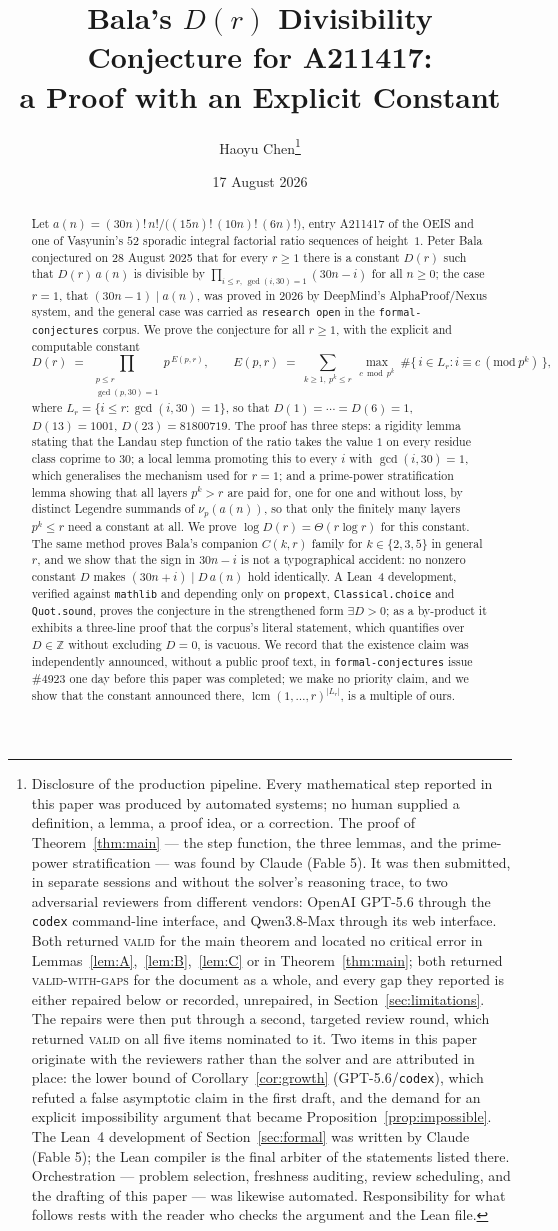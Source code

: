 \documentclass[11pt]{article}
\title{Bala's $D(r)$ Divisibility Conjecture for A211417:\\
a Proof with an Explicit Constant}
\author{Haoyu Chen\thanks{%
Disclosure of the production pipeline. Every mathematical step reported in this paper was
produced by automated systems; no human supplied a definition, a lemma, a proof idea, or a
correction. The proof of Theorem~\ref{thm:main} --- the step function, the three lemmas, and the
prime-power stratification --- was found by Claude (Fable 5). It was then submitted, in separate
sessions and without the solver's reasoning trace, to two adversarial reviewers from different
vendors: OpenAI GPT-5.6 through the \texttt{codex} command-line interface, and Qwen3.8-Max
through its web interface. Both returned \textsc{valid} for the main theorem and located no
critical error in Lemmas~\ref{lem:A},~\ref{lem:B},~\ref{lem:C} or in
Theorem~\ref{thm:main}; both returned \textsc{valid-with-gaps} for the document as a whole, and
every gap they reported is either repaired below or recorded, unrepaired, in
Section~\ref{sec:limitations}. The repairs were then put through a second, targeted review round,
which returned \textsc{valid} on all five items nominated to it. Two items in this paper originate with the reviewers rather than
the solver and are attributed in place: the lower bound of Corollary~\ref{cor:growth}
(GPT-5.6/\texttt{codex}), which refuted a false asymptotic claim in the first draft, and the
demand for an explicit impossibility argument that became
Proposition~\ref{prop:impossible}. The Lean~4 development of
Section~\ref{sec:formal} was written by Claude (Fable 5); the Lean compiler is the final arbiter
of the statements listed there. Orchestration --- problem selection, freshness auditing, review
scheduling, and the drafting of this paper --- was likewise automated. Responsibility for what
follows rests with the reader who checks the argument and the Lean file.}}
\date{17 August 2026}
\theoremstyle{plain}
\theoremstyle{definition}
\theoremstyle{remark}
\numberwithin{equation}{section}
\newcommand{\Z}{\mathbb{Z}}
\DeclareMathOperator{\lcm}{lcm}
\begin{document}
\maketitle

\begin{abstract}
Let $a(n) = (30n)!\,n!/\bigl((15n)!\,(10n)!\,(6n)!\bigr)$, entry A211417 of the OEIS and one of
Vasyunin's $52$ sporadic integral factorial ratio sequences of height~$1$. Peter Bala
conjectured on 28 August 2025 that for every $r \ge 1$ there is a constant $D(r)$ such that
$D(r)\,a(n)$ is divisible by $\prod_{i \le r,\ \gcd(i,30)=1}(30n-i)$ for all $n \ge 0$; the case
$r=1$, that $(30n-1) \mid a(n)$, was proved in 2026 by DeepMind's AlphaProof/Nexus system, and
the general case was carried as \texttt{research open} in the \texttt{formal-conjectures} corpus.
We prove the conjecture for all $r \ge 1$, with the explicit and computable constant
\[
  D(r) \;=\; \prod_{\substack{p \le r\\ \gcd(p,30)=1}} p^{\,E(p,r)},
  \qquad
  E(p,r) \;=\; \sum_{k \ge 1,\ p^k \le r}\ \max_{c \bmod p^k}\
  \#\{\, i \in L_r : i \equiv c \ (\mathrm{mod}\ p^k)\,\},
\]
where $L_r = \{i \le r : \gcd(i,30)=1\}$,
so that $D(1) = \cdots = D(6) = 1$, $D(13) = 1001$, $D(23) = 81800719$. The proof has three
steps: a rigidity lemma stating that the Landau step function of the ratio takes the value $1$ on
every residue class coprime to $30$; a local lemma promoting this to every $i$ with
$\gcd(i,30)=1$, which generalises the mechanism used for $r=1$; and a prime-power stratification
lemma showing that all layers $p^k > r$ are paid for, one for one and without loss, by distinct
Legendre summands of $\nu_p(a(n))$, so that only the finitely many layers $p^k \le r$ need a
constant at all. We prove $\log D(r) = \Theta(r \log r)$ for this constant. The same method
proves Bala's companion $C(k,r)$ family for $k \in \{2,3,5\}$ in general $r$, and we show that
the sign in $30n - i$ is not a typographical accident: no nonzero constant $D$ makes
$(30n+i) \mid D\,a(n)$ hold identically. A Lean~4 development, verified against \texttt{mathlib}
and depending only on \texttt{propext}, \texttt{Classical.choice} and \texttt{Quot.sound}, proves
the conjecture in the strengthened form $\exists D > 0$; as a by-product it exhibits a three-line
proof that the corpus's literal statement, which quantifies over $D \in \Z$ without excluding
$D=0$, is vacuous. We record that the existence claim was independently announced, without a
public proof text, in \texttt{formal-conjectures} issue \#4923 one day before this paper was
completed; we make no priority claim, and we show that the constant announced there,
$\lcm(1,\dots,r)^{|L_r|}$, is a multiple of ours.
\end{abstract}
\end{document}
